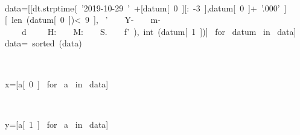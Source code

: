 \begin{paracol}{2}
\smallskip
\begin{cellExecute}[escapechar=~]
~~
\end{cellExecute}
\switchcolumn
\begin{codeCell}[escapechar=~]
data=[[dt.strptime(~\textcolor{mtk25}{'2019-10-29 '}~+[datum[~\textcolor{mtk7}{0}~][:~\textcolor{mtk7}{-3}~],datum[~\textcolor{mtk7}{0}~]+~\textcolor{mtk25}{'.000'}~][~\textcolor{mtk13}{len}~(datum[~\textcolor{mtk7}{0}~])<~\textcolor{mtk7}{9}~], ~\textcolor{mtk25}{'}~~~~\textcolor{mtk25}{Y-}~~~~\textcolor{mtk25}{m-}~~~~\textcolor{mtk25}{d }~~~~\textcolor{mtk25}{H:}~~~~\textcolor{mtk25}{M:}~~~~\textcolor{mtk25}{S.}~~~~\textcolor{mtk25}{f'}~),~\textcolor{mtk12}{int}~(datum[~\textcolor{mtk7}{1}~])] ~\textcolor{mtk17}{for}~ datum ~\textcolor{mtk6}{in}~ data]
data=~\textcolor{mtk13}{sorted}~(data)
\end{codeCell}
\end{paracol}

\begin{paracol}{2}
\smallskip
\begin{cellExecute}[escapechar=~]
~~
\end{cellExecute}
\switchcolumn
\begin{codeCell}[escapechar=~]
x=[a[~\textcolor{mtk7}{0}~] ~\textcolor{mtk17}{for}~ a ~\textcolor{mtk6}{in}~ data]
\end{codeCell}
\end{paracol}

\begin{paracol}{2}
\smallskip
\begin{cellExecute}[escapechar=~]
~~
\end{cellExecute}
\switchcolumn
\begin{codeCell}[escapechar=~]
y=[a[~\textcolor{mtk7}{1}~] ~\textcolor{mtk17}{for}~ a ~\textcolor{mtk6}{in}~ data]
\end{codeCell}
\end{paracol}

